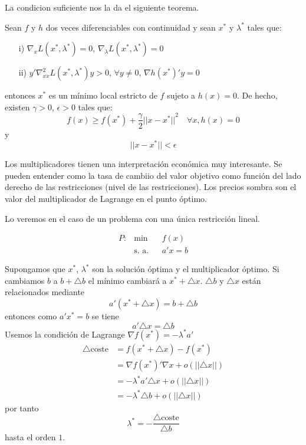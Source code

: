 \documentclass[PM.tex]{subfiles}
\begin{document}
La condicion suficiente nos la da el siguiente teorema.
\begin{theorem} Sean $f$ y $h$ dos veces diferenciables con continuidad y  sean $x^*$ y $λ^*$ tales que:
\begin{enumerate}
	\item[i)] $\nabla_x L(x^*,λ^*) = 0$, $\nabla_{λ} L(x^*, λ^*) = 0$
	\item[ii)] $y'\nabla^2_{xx} L(x^*, λ^*) y > 0$, $\forall y \neq 0$, $\nabla h(x^*)'y = 0$
\end{enumerate}
entonces $x^*$ es un mínimo local estricto de $f$ sujeto a $h(x) = 0$. De hecho, existen $γ > 0$, $ϵ > 0$ tales que:
	\[ f(x) ≥ f(x^*) + \frac{γ}{2} {||x-x^*||}^2 \quad \forall x, h(x) = 0 \]
	y
	\[ ||x-x^*|| < ϵ \]
\end{theorem}

	Los multiplicadores tienen una interpretación económica muy interesante. Se pueden entender como la tasa de cambiio del valor objetivo como función del lado derecho de las restricciones (nivel de las restricciones). Los precios sombra son el valor del multiplicador de Lagrange en el punto óptimo.
	
	Lo veremos en el caso de un problema con una única restricción lineal.
	
	\begin{equation}\label{lagrange-ejem}\begin{aligned}
	P: & \min
	& & f(x) \\
	& \text{s. a.}
	& & a'x = b
	\end{aligned}\end{equation}
	
	Supongamos que $x^*$, $λ^*$ son la solución óptima y el multiplicador óptimo. Si cambiamos $b$ a $b + \triangle b$ el mínimo cambiará a $x^* + \triangle x$. $\triangle b$ y $\triangle x$ están relacionados mediante
	\[ a'(x^* + \triangle x) = b + \triangle b \]
	entonces como $a'x^* = b$ se tiene
	\[ a' \triangle x = \triangle b \]
	Usemos la condición de Lagrange $\nabla f(x^*) = -λ^* a'$
	\begin{align*}
	\triangle \text{coste} & = f(x^* + \triangle x) - f(x^*)\\
		& = \nabla f(x^*)' \nabla x + o(||\triangle x||)\\
		& = - λ^* a' \triangle x + o(||\triangle x||)\\
		& = - λ^* \triangle b + o(||\triangle x||)
	\end{align*}
	por tanto
	\[ λ^* = -\frac{\triangle \text{coste}}{\triangle b} \]
	hasta el orden $1$.
	
\end{document}
